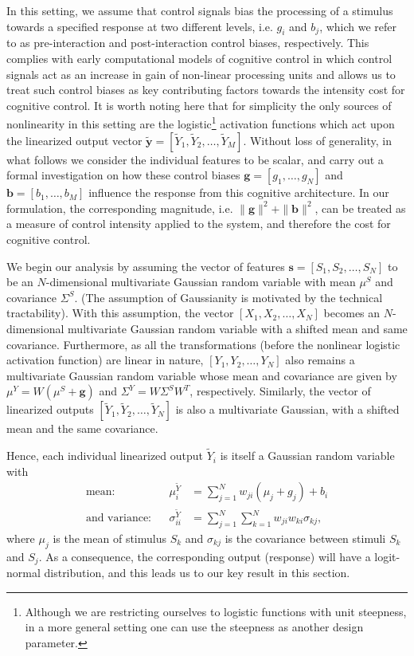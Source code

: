 \documentclass[10pt,letterpaper]{article}
\begin{document}
In this setting, we assume that control signals bias the processing of a stimulus towards a specified response at two different levels, i.e. $g_i$ and $b_j$, which we refer to as pre-interaction and post-interaction control biases, respectively. This complies with early computational models of cognitive control in which control signals act as an increase in gain of non-linear processing units \cite{cohen1990control,Botvinick_etal_2001} and allows us to treat such control biases as key contributing factors towards the intensity cost for cognitive control. It is worth noting here that for simplicity the only sources of nonlinearity in this setting are the logistic\footnote{Although we are restricting ourselves to logistic functions with unit steepness, in a more general setting one can use the steepness as another design parameter.} activation functions which act upon the linearized output vector $\tilde{\mathbf{y}} = [\tilde{Y}_1, \tilde{Y}_2, \ldots, \tilde{Y}_M]$. Without loss of generality, in what follows we consider the individual features to be scalar, and carry out a formal investigation on how these control biases $\mathbf{g} = [g_1,\ldots,g_N]$ and $\mathbf{b} = [b_1,\ldots,b_M]$ influence the response from this cognitive architecture. In our formulation, the corresponding magnitude, i.e. $\|\mathbf{g}\|^2+\|\mathbf{b}\|^2$, can be treated as a measure of control intensity applied to the system, and therefore the cost for cognitive control.

We begin our analysis by assuming the vector of features $\mathbf{s} = [S_1,S_2,\ldots,S_N]$ to be an $N$-dimensional multivariate Gaussian random variable with mean $\mu^S$ and covariance $\Sigma^S$. (The assumption of Gaussianity is motivated by the technical tractability). With this assumption, the vector $[X_1, X_2, \ldots, X_N]$ becomes an $N$-dimensional multivariate Gaussian random variable with a shifted mean and same covariance. Furthermore, as all the transformations (before the nonlinear logistic activation function) are linear in nature, $[Y_1,Y_2,\ldots,Y_N]$ also remains a multivariate Gaussian random variable whose mean and covariance are given by $\mu^Y = W(\mu^S+\mathbf{g})$ and $\Sigma^Y =  W \Sigma^S W^T$, respectively. Similarly, the vector of linearized outputs $[\tilde{Y}_1, \tilde{Y}_2, \ldots, \tilde{Y}_N]$ is also a multivariate Gaussian, with a shifted mean and the same covariance.

Hence, each individual linearized output $\tilde{Y}_i$ is itself a Gaussian random variable with 
\begin{displaymath}
\begin{aligned}
\textrm{mean:} && \mu^{\tilde{Y}}_i &= \sum\limits_{j=1}^N w_{ji}(\mu_j + g_j) + b_i
\\
\textrm{and variance:} && \sigma^{\tilde{Y}}_{ii} &= \sum\limits_{j=1}^N \sum\limits_{k=1}^N w_{ji}w_{ki}\sigma_{kj},
\end{aligned}
\end{displaymath}
where $\mu_j$ is the mean of stimulus $S_k$ and $\sigma_{kj}$ is the covariance between stimuli $S_k$ and $S_j$. As a consequence, the corresponding output (response) will have a logit-normal distribution, and this leads us to our key result in this section.
\end{document}

